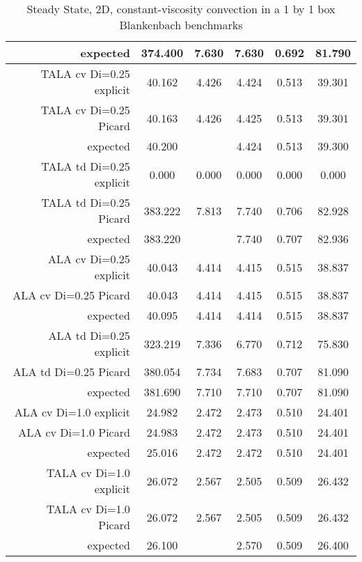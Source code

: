 \documentclass[10pt]{article}
\begin{document}
\begin{table}[h]
\begin{tabular} {| r c c c c c |}
expected & 374.400 & 7.630 & 7.630 & 0.692  & 81.790 \\
\hline 
TALA cv Di=0.25 explicit & 40.162 & 4.426 & 4.424 & 0.513 & 39.301 \\
TALA cv Di=0.25 Picard & 40.163 & 4.426 & 4.425 & 0.513 & 39.301 \\
expected & 40.200 & \null & 4.424 & 0.513 & 39.300 \\
\hline 
TALA td Di=0.25 explicit & 0.000 & 0.000 & 0.000 & 0.000 & 0.000 \\
TALA td Di=0.25 Picard & 383.222 & 7.813 & 7.740 & 0.706 & 82.928 \\
expected & 383.220 & \null & 7.740 & 0.707  & 82.936 \\
\hline 
ALA cv Di=0.25 explicit & 40.043 & 4.414 & 4.415 & 0.515 & 38.837 \\
ALA cv Di=0.25 Picard & 40.043 & 4.414 & 4.415 & 0.515 & 38.837 \\
expected & 40.095 & 4.414 & 4.414 & 0.515 & 38.837 \\
\hline 
ALA td Di=0.25 explicit & 323.219 & 7.336 & 6.770 & 0.712 & 75.830 \\
ALA td Di=0.25 Picard & 380.054 & 7.734 & 7.683 & 0.707 & 81.090 \\
expected & 381.690 & 7.710 & 7.710 & 0.707  & 81.090 \\
\hline 
ALA cv Di=1.0 explicit & 24.982 & 2.472 & 2.473 & 0.510 & 24.401 \\
ALA cv Di=1.0 Picard & 24.983 & 2.472 & 2.473 & 0.510 & 24.401 \\
expected & 25.016 & 2.472 & 2.472 & 0.510  & 24.401 \\
\hline 
TALA cv Di=1.0 explicit  & 26.072 & 2.567 & 2.505 & 0.509 & 26.432 \\
TALA cv Di=1.0 Picard & 26.072 & 2.567 & 2.505 & 0.509 & 26.432 \\
expected & 26.100 & \null & 2.570 & 0.509  & 26.400 \\
\hline 
\end{tabular}
\caption{Steady State, 2D, constant-viscosity convection in a 1 by 1 box Blankenbach benchmarks} 
\end{table}
\end{document}
